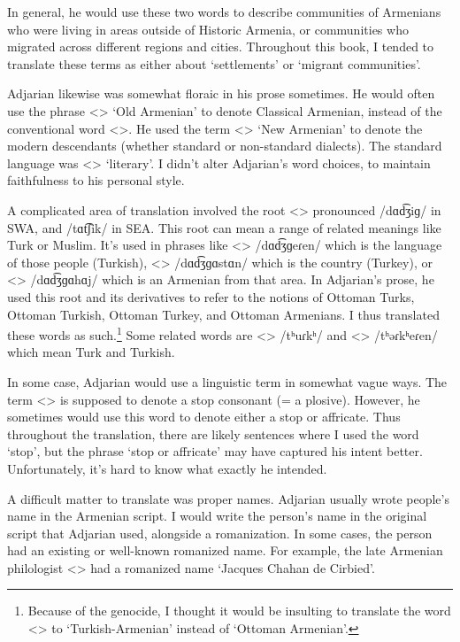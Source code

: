 In general, he would use these two words to describe communities of Armenians who were living in areas outside of Historic Armenia, or communities who migrated across different regions and cities. Throughout this book, I tended to translate these terms as either about `settlements' or `migrant communities'.

Adjarian likewise was somewhat floraic in his prose sometimes. He would often use the phrase <> `Old Armenian' to denote Classical Armenian, instead of the conventional word <>. He used the term <> `New Armenian' to denote the modern descendants (whether standard or non-standard dialects). The standard language was <> `literary'. I didn't alter Adjarian's word choices, to maintain faithfulness to his personal style. 

A complicated area of translation involved the root <> pronounced /dɑd͡ʒiɡ/ in SWA, and /tɑt͡ʃik/ in SEA. This root can mean a range of related meanings like Turk or Muslim. It's used in phrases like <> /dɑd͡ʒɡeɾen/ which is the language of those people (Turkish), <> /dɑd͡ʒɡɑstɑn/ which is the country (Turkey), or <> /dɑd͡ʒɡɑhɑj/ which is an Armenian from that area. In Adjarian's prose, he used this root and its derivatives to refer to the notions of  Ottoman Turks, Ottoman Turkish, Ottoman Turkey, and Ottoman Armenians. I thus translated these words as such.\footnote{Because of the genocide, I thought it would be insulting to translate the word  <> to `Turkish-Armenian' instead of `Ottoman Armenian'. } Some related words are <> /tʰuɾkʰ/ and <> /tʰəɾkʰeɾen/ which mean Turk and Turkish. 

In some case, Adjarian would use a linguistic term in somewhat vague ways. The term <> is supposed to denote a stop consonant (= a plosive). However, he sometimes would use this word to denote either a stop or affricate. Thus throughout the translation, there are likely sentences where I used the word `stop', but the phrase `stop  or affricate' may have captured his intent better. Unfortunately, it's hard to know what exactly he intended. 

A difficult matter to translate was proper names. Adjarian usually wrote people's name in the Armenian script. I would write the person's name in the original script that Adjarian used, alongside a romanization. In some cases, the person had an existing or well-known romanized name. For example, the late Armenian philologist <> had a romanized name `Jacques Chahan de Cirbied'. 

